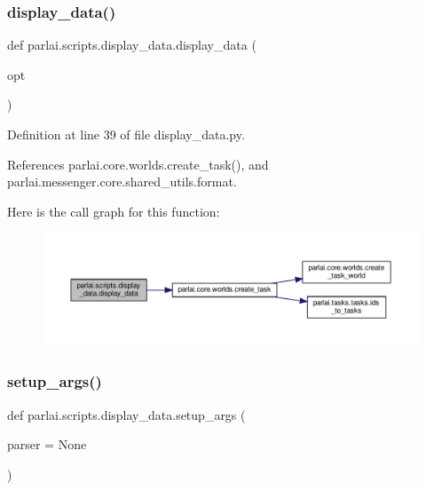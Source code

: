 \subsubsection{\texorpdfstring{display\+\_\+data()}{display\_data()}}
{\footnotesize\ttfamily def parlai.\+scripts.\+display\+\_\+data.\+display\+\_\+data (\begin{DoxyParamCaption}\item[{}]{opt }\end{DoxyParamCaption})}



Definition at line 39 of file display\+\_\+data.\+py.



References parlai.\+core.\+worlds.\+create\+\_\+task(), and parlai.\+messenger.\+core.\+shared\+\_\+utils.\+format.

Here is the call graph for this function\+:
\nopagebreak
\begin{figure}[H]
\begin{center}
\leavevmode
\includegraphics[width=350pt]{namespaceparlai_1_1scripts_1_1display__data_af47c3f49de57cd1a9397b88bf36a8213_cgraph}
\end{center}
\end{figure}
\mbox{\label{namespaceparlai_1_1scripts_1_1display__data_a666e6177939b9a63961e56a1dfdc74b4}} 
\subsubsection{\texorpdfstring{setup\+\_\+args()}{setup\_args()}}
{\footnotesize\ttfamily def parlai.\+scripts.\+display\+\_\+data.\+setup\+\_\+args (\begin{DoxyParamCaption}\item[{}]{parser = {\ttfamily None} }\end{DoxyParamCaption})}




